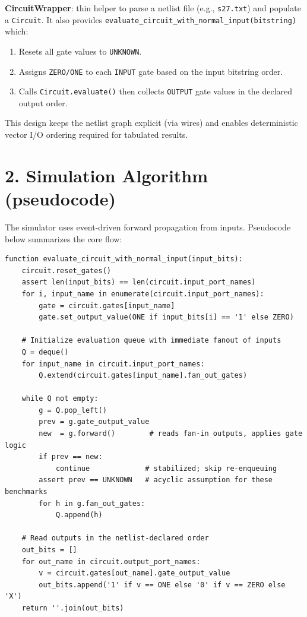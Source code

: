 \documentclass[11pt]{article}
\begin{document}
\textbf{CircuitWrapper}: thin helper to parse a netlist file (e.g., \texttt{s27.txt}) and populate a \texttt{Circuit}. It also provides \texttt{evaluate\_circuit\_with\_normal\_input(bitstring)} which:
\begin{enumerate}
  \item Resets all gate values to \texttt{UNKNOWN}.
  \item Assigns \texttt{ZERO/ONE} to each \texttt{INPUT} gate based on the input bitstring order.
  \item Calls \texttt{Circuit.evaluate()} then collects \texttt{OUTPUT} gate values in the declared output order.
\end{enumerate}

This design keeps the netlist graph explicit (via wires) and enables deterministic vector I/O ordering required for tabulated results.

\section*{2. Simulation Algorithm (pseudocode)}
The simulator uses event-driven forward propagation from inputs. Pseudocode below summarizes the core flow:

\begin{verbatim}
function evaluate_circuit_with_normal_input(input_bits):
    circuit.reset_gates()
    assert len(input_bits) == len(circuit.input_port_names)
    for i, input_name in enumerate(circuit.input_port_names):
        gate = circuit.gates[input_name]
        gate.set_output_value(ONE if input_bits[i] == '1' else ZERO)

    # Initialize evaluation queue with immediate fanout of inputs
    Q = deque()
    for input_name in circuit.input_port_names:
        Q.extend(circuit.gates[input_name].fan_out_gates)

    while Q not empty:
        g = Q.pop_left()
        prev = g.gate_output_value
        new  = g.forward()        # reads fan-in outputs, applies gate logic
        if prev == new:
            continue             # stabilized; skip re-enqueuing
        assert prev == UNKNOWN   # acyclic assumption for these benchmarks
        for h in g.fan_out_gates:
            Q.append(h)

    # Read outputs in the netlist-declared order
    out_bits = []
    for out_name in circuit.output_port_names:
        v = circuit.gates[out_name].gate_output_value
        out_bits.append('1' if v == ONE else '0' if v == ZERO else 'X')
    return ''.join(out_bits)
\end{verbatim}
\end{document}

